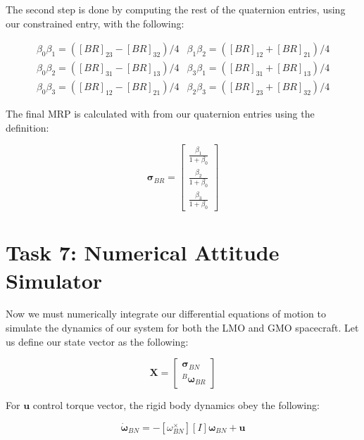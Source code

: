 \documentclass[paper]{aiaaNew}
\begin{document}
The second step is done by computing the rest of the quaternion entries, using our constrained entry, with the following: 

\begin{equation}
  \begin{array}{ll}{\beta_{0} \beta_{1}=\left([BR]_{23}-[BR]_{32}\right) / 4} & {\beta_{1} \beta_{2}=\left([BR]_{12}+[BR]_{21}\right) / 4} \\ {\beta_{0} \beta_{2}=\left([BR]_{31}-[BR]_{13}\right) / 4} & {\beta_{3} \beta_{1}=\left([BR]_{31}+[BR]_{13}\right) / 4} \\ {\beta_{0} \beta_{3}=\left([BR]_{12}-[BR]_{21}\right) / 4} & {\beta_{2} \beta_{3}=\left([BR]_{23}+[BR]_{32}\right) / 4}\end{array}
\end{equation}

The final MRP is calculated with from our quaternion entries using the definition:

\begin{equation}
  \bm{\sigma}_{BR} = \begin{bmatrix}
  \frac{\beta_1}{1+\beta_0} \\
  \frac{\beta_2}{1+\beta_0} \\
  \frac{\beta_3}{1+\beta_0} 
  \end{bmatrix}
\end{equation}






\section*{Task 7: Numerical Attitude Simulator}
Now we must numerically integrate our differential equations of motion to simulate the dynamics of our system for both the LMO and GMO spacecraft. Let us define our state vector as the following: 

\begin{equation}
  \bm{X} = \begin{bmatrix}
  \bm{\sigma}_{BN} \\
  ^B\bm{\omega}_{BR}
  \end{bmatrix}
\end{equation}

For $\bm{u}$ control torque vector, the rigid body dynamics obey the following:

\begin{equation}
  [I]\bm{\dot{\omega}}_{BN} = -[\omega_{BN}^\times][I]\bm{\omega}_{BN} + \bm{u}
\end{equation}
\end{document}
